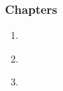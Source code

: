 \begin{frame}[fragile,label=outline] 
\frametitle{Chapters}
\begin{center}
\begin{minipage}{3.25in}
\begin{enumerate}
\item  \hyperlink{s-project<1>}    {\BUTTON {\erow{\sProject}}} \\
\item  \hyperlink{s-parameters<1>} {\BUTTON {\erow{\sParameters}}} \\
\item  \hyperlink{s-devel<1>} {\BUTTON {\erow{\sDevel}}}
\end{enumerate}
\end{minipage}
\end{center}
\end{frame}


  
  
  

\NEWMOD

\section{\sProject}

